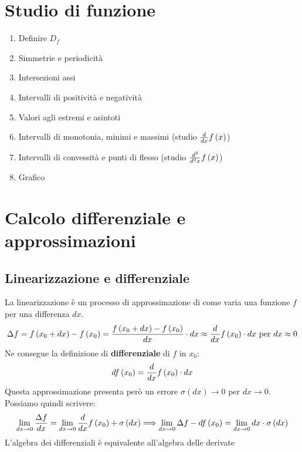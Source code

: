 \documentclass{report}
\begin{document}
\section{Studio di funzione}
    \begin{enumerate}
        \item Definire $D_f$
        \item Simmetrie e periodicità
        \item Intersezioni assi
        \item Intervalli di positività e negatività
        \item Valori agli estremi e asintoti
        \item Intervalli di monotonia, minimi e massimi (studio $\D{x}f\left(x\right)$)
        \item Intervalli di convessità e punti di flesso (studio $\D{x}{2}f\left(x\right)$)
        \item Grafico
    \end{enumerate}
\section{Calcolo differenziale e approssimazioni}
    \subsection{Linearizzazione e differenziale}
        La linearizzazione è un processo di approssimazione di come varia una funzione
        $f$ per una differenza $dx$. 
        $$\Delta f = f\left(x_0 + dx\right) - f\left(x_0\right) = \frac{f\left(x_0 + dx\right) - f\left(x_0\right)}{dx} \cdot dx \approx \D{x}f\left(x_0\right) \cdot dx \textrm{ per } dx \approx 0$$
        Ne consegue la definizione di \textbf{differenziale} di $f$ in $x_0$:
        $$df\left(x_0\right) = \D{x}f\left(x_0\right) \cdot dx$$
        Questa approssimazione presenta però un errore $\sigma\left(dx\right) \rightarrow 0$ per $dx \rightarrow 0$. \\
        Possiamo quindi scrivere:
        $$\lim_{dx \to 0}\frac{\Delta f}{dx} = \lim_{dx \to 0}\D{x}f\left(x_0\right) + \sigma\left(dx\right) 
            \Longrightarrow \lim_{dx \to 0}\Delta f - df\left(x_0\right) = \lim_{dx \to 0}dx \cdot \sigma\left(dx\right)$$
        L'algebra dei differenziali è equivalente all'algebra delle derivate
\end{document}
